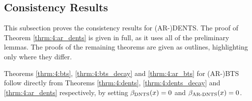             




































\subsection{Consistency Results} 
\label{sec:4-5-3-consistency}

    This subsection proves the consistency results for \mbox{(AR-)DENTS}. The proof of Theorem \ref{thrm:4:ar_dents} is given in full, as it uses all of the preliminary lemmas. The proofs of the remaining theorems are given as outlines, highlighting only where they differ.

    Theorems \ref{thrm:4:bts}, \ref{thrm:4:bts_decay} and \ref{thrm:4:ar_bts} for \mbox{(AR-)BTS} follow directly from Theorems \ref{thrm:4:dents}, \ref{thrm:4:dents_decay} and \ref{thrm:4:ar_dents} respectively, by setting ${\beta_{{\textnormal{DNTS}}}}(x)=0$ and ${\beta_{{\textnormal{AR-DNTS}}}}(x)=0$.

